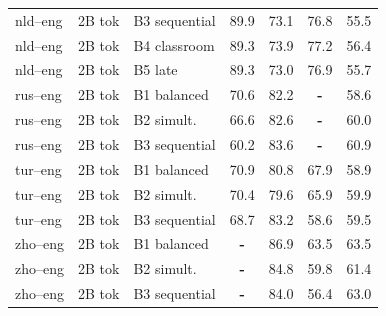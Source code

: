 \begin{table}[t]
\begin{tabular}{lll cc cc}
nld--eng & 2B tok & B3 sequential & \cellcolor[rgb]{0.779,1.000,0.779} 89.9 & \cellcolor[rgb]{0.874,1.000,0.874} 73.1 & \cellcolor[rgb]{0.810,1.000,0.810} 76.8 & \cellcolor[rgb]{0.955,1.000,0.955} 55.5 \\
nld--eng & 2B tok & B4 classroom & \cellcolor[rgb]{0.783,1.000,0.783} 89.3 & \cellcolor[rgb]{0.870,1.000,0.870} 73.9 & \cellcolor[rgb]{0.807,1.000,0.807} 77.2 & \cellcolor[rgb]{0.947,1.000,0.947} 56.4 \\
nld--eng & 2B tok & B5 late & \cellcolor[rgb]{0.783,1.000,0.783} 89.3 & \cellcolor[rgb]{0.875,1.000,0.875} 73.0 & \cellcolor[rgb]{0.809,1.000,0.809} 76.9 & \cellcolor[rgb]{0.953,1.000,0.953} 55.7 \\
rus--eng  & 2B tok & B1 balanced & \cellcolor[rgb]{0.886,1.000,0.886} 70.6 & \cellcolor[rgb]{0.824,1.000,0.824} 82.2 & \textbf{-} & \cellcolor[rgb]{0.929,1.000,0.929} 58.6 \\
rus--eng  & 2B tok & B2 simult. & \cellcolor[rgb]{0.908,1.000,0.908} 66.6 & \cellcolor[rgb]{0.822,1.000,0.822} 82.6 & \textbf{-} & \cellcolor[rgb]{0.918,1.000,0.918} 60.0 \\
rus--eng  & 2B tok & B3 sequential & \cellcolor[rgb]{0.944,1.000,0.944} 60.2 & \cellcolor[rgb]{0.817,1.000,0.817} 83.6 & \textbf{-} & \cellcolor[rgb]{0.910,1.000,0.910} 60.9 \\
tur--eng  & 2B tok & B1 balanced & \cellcolor[rgb]{0.884,1.000,0.884} 70.9 & \cellcolor[rgb]{0.832,1.000,0.832} 80.8 & \cellcolor[rgb]{0.873,1.000,0.873} 67.9 & \cellcolor[rgb]{0.927,1.000,0.927} 58.9 \\
tur--eng  & 2B tok & B2 simult. & \cellcolor[rgb]{0.887,1.000,0.887} 70.4 & \cellcolor[rgb]{0.839,1.000,0.839} 79.6 & \cellcolor[rgb]{0.887,1.000,0.887} 65.9 & \cellcolor[rgb]{0.919,1.000,0.919} 59.9 \\
tur--eng  & 2B tok & B3 sequential & \cellcolor[rgb]{0.897,1.000,0.897} 68.7 & \cellcolor[rgb]{0.819,1.000,0.819} 83.2 & \cellcolor[rgb]{0.939,1.000,0.939} 58.6 & \cellcolor[rgb]{0.922,1.000,0.922} 59.5 \\
zho--eng & 2B tok & B1 balanced & \textbf{-} & \cellcolor[rgb]{0.799,1.000,0.799} 86.9 & \cellcolor[rgb]{0.904,1.000,0.904} 63.5 & \cellcolor[rgb]{0.889,1.000,0.889} 63.5 \\
zho--eng & 2B tok & B2 simult. & \textbf{-} & \cellcolor[rgb]{0.810,1.000,0.810} 84.8 & \cellcolor[rgb]{0.930,1.000,0.930} 59.8 & \cellcolor[rgb]{0.906,1.000,0.906} 61.4 \\
zho--eng & 2B tok & B3 sequential & \textbf{-} & \cellcolor[rgb]{0.815,1.000,0.815} 84.0 & \cellcolor[rgb]{0.955,1.000,0.955} 56.4 & \cellcolor[rgb]{0.893,1.000,0.893} 63.0 \\

\end{tabular}
\end{table}
